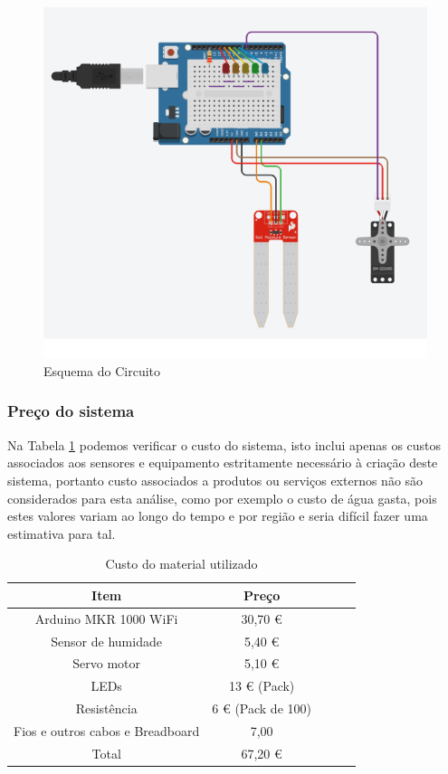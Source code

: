 \documentclass[conference]{IEEEtran}
\begin{document}
\begin{figure}
    \centering
    \includegraphics[scale=0.5]{soil-moisture-circuit-schema.png}
    \caption{Esquema do Circuito}
    \label{fig:circuit}
\end{figure}

\subsubsection{Preço do sistema}

Na Tabela \ref{pricetable} podemos verificar o custo do sistema, 
isto inclui apenas os custos associados aos sensores e equipamento 
estritamente necessário à criação deste sistema, portanto custo associados 
a produtos ou serviços externos não são considerados para esta análise, 
como por exemplo o custo de água gasta, pois estes valores variam ao longo 
do tempo e por região e seria difícil fazer uma estimativa para tal.

\begin{table}[ht]
\centering
\small
\begin{tabular}{|c|c|c|c|c|}
    \hline
    \rowcolor{gray}
    \color{white}Item & \color{white}Preço \\
    \hline
    Arduino MKR 1000 WiFi & 30,70 € \\
    \hline
    Sensor de humidade & 5,40 € \\
    \hline
    Servo motor & 5,10 € \\
    \hline
    LEDs & 13 € (Pack) \\
    \hline
    Resistência & 6 € (Pack de 100) \\
    \hline
    Fios e outros cabos e Breadboard & 7,00 \\
    \hline
    \rowcolor{gray}
    \color{white}Total & \color{white}67,20 € \\
    \hline
\end{tabular}
\vspace{1em}
\caption{Custo do material utilizado}
\label{pricetable}
\end{table}
\end{document}

